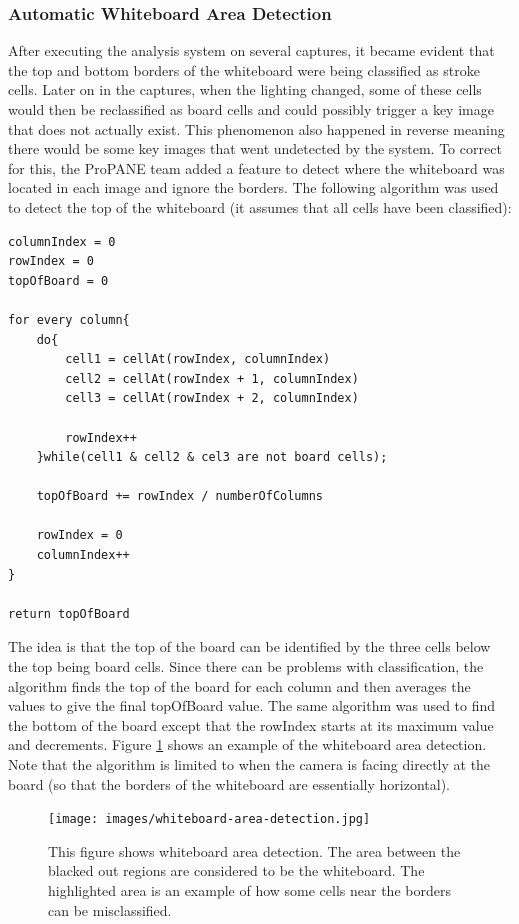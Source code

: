 \documentclass[]{article}
\begin{document}
			\subsubsection{Automatic Whiteboard Area Detection}
				After executing the analysis system on several captures, it became evident that the top and bottom borders of the whiteboard were being classified as stroke cells. Later on in the captures, when the lighting changed, some of these cells would then be reclassified as board cells and could possibly trigger a key image that does not actually exist. This phenomenon also happened in reverse meaning there would be some key images that went undetected by the system. To correct for this, the ProPANE team added a feature to detect where the whiteboard was located in each image and ignore the borders. The following algorithm was used to detect the top of the whiteboard (it assumes that all cells have been classified):
				\begin{lstlisting}
columnIndex = 0
rowIndex = 0
topOfBoard = 0

for every column{
	do{
		cell1 = cellAt(rowIndex, columnIndex)
		cell2 = cellAt(rowIndex + 1, columnIndex)
		cell3 = cellAt(rowIndex + 2, columnIndex)
		
		rowIndex++
	}while(cell1 & cell2 & cel3 are not board cells);
	
	topOfBoard += rowIndex / numberOfColumns
	
	rowIndex = 0
	columnIndex++
}		

return topOfBoard
				\end{lstlisting}
				The idea is that the top of the board can be identified by the three cells below the top being board cells. Since there can be problems with classification, the algorithm finds the top of the board for each column and then averages the values to give the final topOfBoard value. The same algorithm was used to find the bottom of the board except that the rowIndex starts at its maximum value and decrements. Figure \ref{img:whiteboard-area-detection} shows an example of the whiteboard area detection. Note that the algorithm is limited to when the camera is facing directly at the board (so that the borders of the whiteboard are essentially horizontal). 
				
				\begin{figure}[h]
					\centering
					\texttt{[image: images/whiteboard-area-detection.jpg]}
					\caption{This figure shows whiteboard area detection. The area between the blacked out regions are considered to be the whiteboard. The highlighted area is an example of how some cells near the borders can be misclassified. }
					\label{img:whiteboard-area-detection}
				\end{figure}
						
\end{document}
